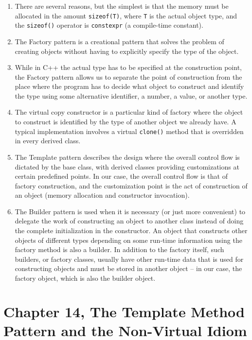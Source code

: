 \begin{enumerate}
\item
  There are several reasons, but the simplest is that the memory must be allocated in the amount \texttt{sizeof(T)}, where \texttt{T} is the actual object type, and the \texttt{sizeof()} operator is \texttt{constexpr} (a compile-time constant).
\item
  The Factory pattern is a creational pattern that solves the problem of creating objects without having to explicitly specify the type of the object.
\item
  While in C++ the actual type has to be specified at the construction point, the Factory pattern allows us to separate the point of construction from the place where the program has to decide what object to construct and identify the type using some alternative identifier, a number, a value, or another type.
\item
  The virtual copy constructor is a particular kind of factory where the object to construct is identified by the type of another object we already have. A typical implementation involves a virtual \texttt{clone()} method that is overridden in every derived class.
\item
  The Template pattern describes the design where the overall control flow is dictated by the base class, with derived classes providing customizations at certain predefined points. In our case, the overall control flow is that of factory construction, and the customization point is the act of construction of an object (memory allocation and constructor invocation).
\item
  The Builder pattern is used when it is necessary (or just more convenient) to delegate the work of constructing an object to another class instead of doing the complete initialization in the constructor. An object that constructs other objects of different types depending on some run-time information using the factory method is also a builder. In addition to the factory itself, such builders, or factory classes, usually have other run-time data that is used for constructing objects and must be stored in another object -- in our case, the factory object, which is also the builder object.
\end{enumerate}

\section{Chapter 14, The Template Method Pattern and the Non-Virtual Idiom}

